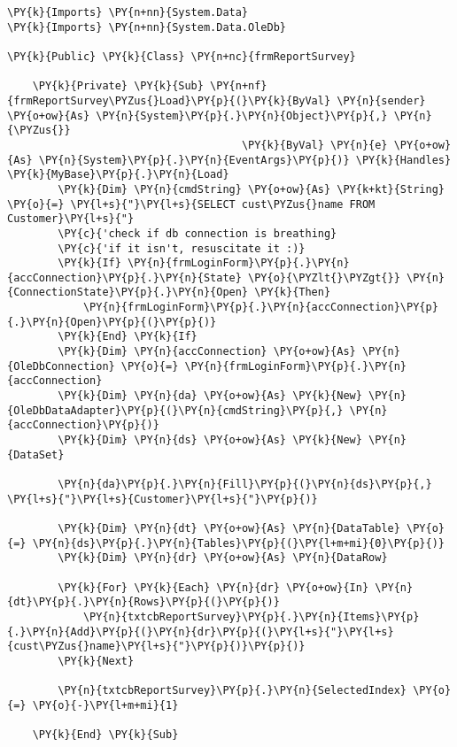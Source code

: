 \begin{Verbatim}[commandchars=\\\{\}]
\PY{k}{Imports} \PY{n+nn}{System.Data}
\PY{k}{Imports} \PY{n+nn}{System.Data.OleDb}

\PY{k}{Public} \PY{k}{Class} \PY{n+nc}{frmReportSurvey}

    \PY{k}{Private} \PY{k}{Sub} \PY{n+nf}{frmReportSurvey\PYZus{}Load}\PY{p}{(}\PY{k}{ByVal} \PY{n}{sender} \PY{o+ow}{As} \PY{n}{System}\PY{p}{.}\PY{n}{Object}\PY{p}{,} \PY{n}{\PYZus{}}
                                     \PY{k}{ByVal} \PY{n}{e} \PY{o+ow}{As} \PY{n}{System}\PY{p}{.}\PY{n}{EventArgs}\PY{p}{)} \PY{k}{Handles} \PY{k}{MyBase}\PY{p}{.}\PY{n}{Load}
        \PY{k}{Dim} \PY{n}{cmdString} \PY{o+ow}{As} \PY{k+kt}{String} \PY{o}{=} \PY{l+s}{"}\PY{l+s}{SELECT cust\PYZus{}name FROM Customer}\PY{l+s}{"}
        \PY{c}{'check if db connection is breathing}
        \PY{c}{'if it isn't, resuscitate it :)}
        \PY{k}{If} \PY{n}{frmLoginForm}\PY{p}{.}\PY{n}{accConnection}\PY{p}{.}\PY{n}{State} \PY{o}{\PYZlt{}\PYZgt{}} \PY{n}{ConnectionState}\PY{p}{.}\PY{n}{Open} \PY{k}{Then}
            \PY{n}{frmLoginForm}\PY{p}{.}\PY{n}{accConnection}\PY{p}{.}\PY{n}{Open}\PY{p}{(}\PY{p}{)}
        \PY{k}{End} \PY{k}{If}
        \PY{k}{Dim} \PY{n}{accConnection} \PY{o+ow}{As} \PY{n}{OleDbConnection} \PY{o}{=} \PY{n}{frmLoginForm}\PY{p}{.}\PY{n}{accConnection}
        \PY{k}{Dim} \PY{n}{da} \PY{o+ow}{As} \PY{k}{New} \PY{n}{OleDbDataAdapter}\PY{p}{(}\PY{n}{cmdString}\PY{p}{,} \PY{n}{accConnection}\PY{p}{)}
        \PY{k}{Dim} \PY{n}{ds} \PY{o+ow}{As} \PY{k}{New} \PY{n}{DataSet}

        \PY{n}{da}\PY{p}{.}\PY{n}{Fill}\PY{p}{(}\PY{n}{ds}\PY{p}{,} \PY{l+s}{"}\PY{l+s}{Customer}\PY{l+s}{"}\PY{p}{)}

        \PY{k}{Dim} \PY{n}{dt} \PY{o+ow}{As} \PY{n}{DataTable} \PY{o}{=} \PY{n}{ds}\PY{p}{.}\PY{n}{Tables}\PY{p}{(}\PY{l+m+mi}{0}\PY{p}{)}
        \PY{k}{Dim} \PY{n}{dr} \PY{o+ow}{As} \PY{n}{DataRow}

        \PY{k}{For} \PY{k}{Each} \PY{n}{dr} \PY{o+ow}{In} \PY{n}{dt}\PY{p}{.}\PY{n}{Rows}\PY{p}{(}\PY{p}{)}
            \PY{n}{txtcbReportSurvey}\PY{p}{.}\PY{n}{Items}\PY{p}{.}\PY{n}{Add}\PY{p}{(}\PY{n}{dr}\PY{p}{(}\PY{l+s}{"}\PY{l+s}{cust\PYZus{}name}\PY{l+s}{"}\PY{p}{)}\PY{p}{)}
        \PY{k}{Next}

        \PY{n}{txtcbReportSurvey}\PY{p}{.}\PY{n}{SelectedIndex} \PY{o}{=} \PY{o}{-}\PY{l+m+mi}{1}

    \PY{k}{End} \PY{k}{Sub}



\end{Verbatim}
